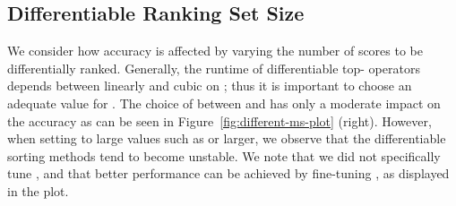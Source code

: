 \documentclass{article}
\begin{document}
\begin{table}[t]
\subsection{Differentiable Ranking Set Size }
We consider how accuracy is affected by varying the number of scores  to be differentially ranked. 
Generally, the runtime of differentiable top- operators depends between linearly and cubic on ; thus it is important to choose an adequate value for .
The choice of  between  and  has only a moderate impact on the accuracy as can be seen in Figure~\ref{fig:different-ms-plot} (right).
However, when setting  to large values such as  or larger, we observe that the differentiable sorting methods tend to become unstable.
We note that we did not specifically tune , and that better performance can be achieved by fine-tuning , as displayed in the plot.



\begin{table}[t]
    \centering
    \addtolength{\tabcolsep}{-4pt}  
    \addtolength{\tabcolsep}{4pt}  
    \vspace*{-.5em}
    \caption{
        CIFAR-100 results for different distributions  for training a ResNet18 from scratch.
        The metrics are Top-Top- accuracy averaged over 2 seeds.
    }
    \label{tab:cifar100-different-PK}
    \vspace*{-.25em}
\end{table}



\end{table}
\end{document}
